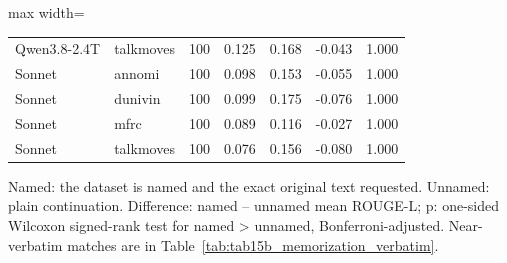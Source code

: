\begin{table}[t]
\begin{adjustbox}{max width=\linewidth}
\begin{tabular}{llrrrrr}
Qwen3.8-2.4T & talkmoves & 100 & 0.125 & 0.168 & -0.043 & 1.000 \\
Sonnet & annomi & 100 & 0.098 & 0.153 & -0.055 & 1.000 \\
Sonnet & dunivin & 100 & 0.099 & 0.175 & -0.076 & 1.000 \\
Sonnet & mfrc & 100 & 0.089 & 0.116 & -0.027 & 1.000 \\
Sonnet & talkmoves & 100 & 0.076 & 0.156 & -0.080 & 1.000 \\
\bottomrule
\end{tabular}
\end{adjustbox}
\par\smallskip\footnotesize\raggedright Named: the dataset is named and the exact original text requested. Unnamed: plain continuation. Difference: named -- unnamed mean ROUGE-L; p: one-sided Wilcoxon signed-rank test for named > unnamed, Bonferroni-adjusted. Near-verbatim matches are in Table~\ref{tab:tab15b_memorization_verbatim}.
\end{table}
